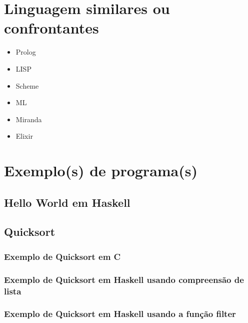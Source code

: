 \documentclass[
  12pt,				         %
  oneside,			       %
  a4paper,			       %
  english,		       	 %
  brazil,			      	 %
]{abntex2}
\begin{document}
    \newpage

    \chapter{Linguagem similares ou confrontantes}

    \begin{itemize}
      \item Prolog
      \item LISP 
      \item Scheme 
      \item ML 
      \item Miranda 
      \item Elixir 
    \end{itemize}

    \newpage

    \chapter{Exemplo(s) de programa(s)}

      \setcounter{section}{0}

      \section{Hello World em Haskell}
      

      \section{Quicksort}
      \subsection{Exemplo de Quicksort em C}

      
      \subsection{Exemplo de Quicksort em Haskell usando compreensão de lista} 

            

      \newpage

      \subsection{Exemplo de Quicksort em Haskell usando a função filter}
\end{document}
